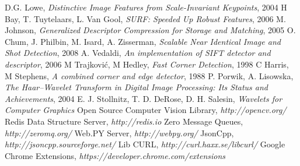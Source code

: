 \documentclass[a4paper,5pt]{thesis.cs.pub.ro}
\begin{document}
\begin{thebibliography}{16}

D.G. Lowe, \emph{Distinctive Image Features from Scale-Invariant Keypoints}, 2004
H Bay, T. Tuytelaars, L. Van Gool, \emph{SURF: Speeded Up Robust Features}, 2006
M. Johnson, \emph{Generalized Descriptor Compression for Storage and Matching}, 2005
O. Chum, J. Philbin, M. Isard, A. Zisserman, \emph{Scalable Near Identical Image and Shot Detection}, 2008
A. Vedaldi, \emph{An implementation of SIFT detector and descriptor}, 2006
M Trajković, M Hedley, \emph{Fast Corner Detection}, 1998
C Harris, M Stephens, \emph{A combined corner and edge detector}, 1988
P. Porwik, A. Lisowska, \emph{The Haar–Wavelet Transform in Digital Image Processing: Its Status and Achievements}, 2004
E. J. Stollnitz, T. D. DeRose, D. H. Salesin, \emph{Wavelets for Computer Graphics}
Open Source Computer Vision Library, \emph{http://opencv.org/}
Redis Data Structure Server, \emph{http://redis.io}
Zero Message Queues, \emph{http://zeromq.org/}
Web.PY Server, \emph{http://webpy.org/}
JsonCpp, \emph{http://jsoncpp.sourceforge.net/}
Lib CURL, \emph{http://curl.haxx.se/libcurl/}
Google Chrome Extensions, \emph{https://developer.chrome.com/extensions}
\end{thebibliography}
\end{document}
